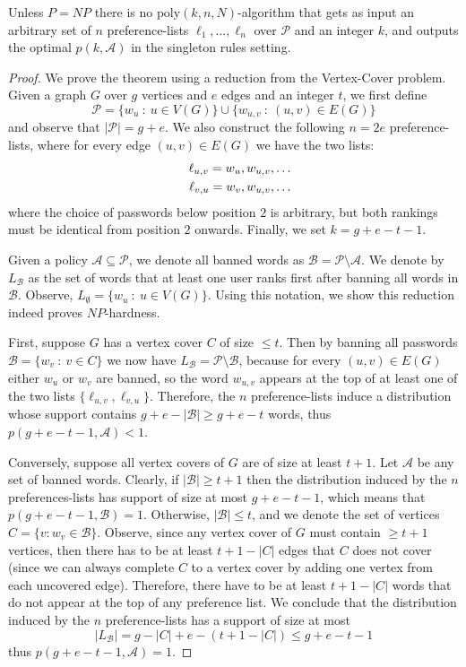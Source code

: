 \documentclass[prodmode,acmec]{ec-acmsmall}
\newcommand{\PasswordSpace}{\mathcal{P}}
\newcommand{\poly}{\ensuremath{\mathrm{poly}}}
\begin{document}
\begin{theorem}\label{thm:hardnessKisParameter}
Unless $P=NP$ there is no $\poly(k,n,N)$-algorithm that gets as input an arbitrary set of $n$ preference-lists $\ell_1,...,\ell_n$ over $\PasswordSpace$ and an integer $k$, and outputs the optimal $p(k,\mathcal{A})$ in the singleton rules setting.
\end{theorem}
\begin{proof}
We prove the theorem using a reduction from the Vertex-Cover problem. Given a graph $G$ over $g$ vertices and $e$ edges and an integer $t$, we first define
\[\PasswordSpace =  \{w_u ~:~ u\in V(G)\} \cup \{w_{u,v} ~:~ (u,v)\in E(G)\}   \]
and observe that $|\PasswordSpace| = g+e$. We also construct the following $n=2e$ preference-lists, where for every edge $(u,v)\in E(G)$ we have the two lists:
\begin{eqnarray*}
&& \ell_{u,v} =  w_u, w_{u,v}, \ldots \cr
&&\ell_{v,u} =  w_v, w_{u,v}, \ldots
\end{eqnarray*}
where the choice of passwords below position $2$ is arbitrary, but both rankings must be identical from position $2$ onwards. Finally, we set $k = g+e-t-1$.

Given a policy $\mathcal{A}\subseteq\PasswordSpace$, we denote all banned words as $\mathcal{B} = \PasswordSpace\setminus \mathcal{A}$. We denote by $L_\mathcal{B}$ as the set of words that at least one user ranks first after banning all words in $\mathcal{B}$. Observe, $L_\emptyset = \{w_u ~:~ u\in V(G)\}$. Using this notation, we show this reduction indeed proves $NP$-hardness.

First, suppose $G$ has a vertex cover $C$ of size $\leq t$. Then by banning all passwords $\mathcal{B} = \{w_v ~:~ v\in C\}$ we now have $L_{\mathcal{B}} = \PasswordSpace \setminus \mathcal{B}$, because for every $(u,v)\in E(G)$ either $w_u$ or $w_v$ are banned, so the word $w_{u,v}$ appears at the top of at least one of the two lists $\{\ell_{u,v}, \ell_{v,u}\}$. Therefore, the $n$ preference-lists induce a distribution whose support contains $g+e - |\mathcal{B}| \geq g+e-t$ words, thus $p(g+e-t-1, \mathcal{A}) < 1$. 

Conversely, suppose all vertex covers of $G$ are of size at least $t+1$. Let $\mathcal{A}$ be any set of banned words. Clearly,  if $|\mathcal{B}| \geq t+1$ then the distribution induced by the $n$ preferences-lists has support of size at most $g+e-t-1$, which means that $p(g+e-t-1, \mathcal{B})=1$. Otherwise, $|\mathcal{B}| \leq t$, and we denote the set of vertices $C = \{v : w_v \in \mathcal{B}\}$. Observe, since any vertex cover of $G$ must contain $\geq t+1$ vertices, then there has to be at least $t+1-|C|$ edges that $C$ does not cover (since we can always complete $C$ to a vertex cover by adding one vertex from each uncovered edge). Therefore, there have to be at least $t+1-|C|$ words that do not appear at the top of any preference list. We conclude that the distribution induced by the $n$ preference-lists has a support of size at most 
\[ |L_{\mathcal{B}}| = g - |C| + e - (t+1 - |C|) \leq g+e-t-1\]
thus $p(g+e-t-1, \mathcal{A})=1$.
\end{proof}
\end{document}
